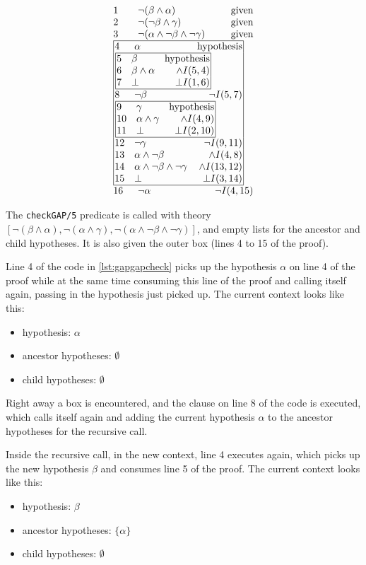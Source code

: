 \documentclass[11pt,twoside,a4paper]{report}
\begin{document}
\[\vbox{\offinterlineskip\halign{
&\tabskip=1.5em#\strut&$#$\hfil\tabskip=1em&\hfil$#$\tabskip=0em\cr
%
1&\neg(\beta\wedge\alpha)&\mbox{given}\cr
2&\neg(\neg\beta\wedge\gamma)&\mbox{given}\cr
3&\neg(\alpha\wedge\neg\beta\wedge\neg\gamma)&\mbox{given}\cr
%
\multispan3\vbox{\halign{
\vrule#&&\hskip.1em\tabskip=1em#\strut&$#$\hfil\tabskip=1em&\hfil$#$\hskip0.1em\tabskip=0em&\vrule#\cr
\noalign{\hrule}
%
&4&\alpha&\mbox{hypothesis}&\cr
%
&\multispan3\,\vbox{\halign{
\vrule#&&\hskip.1em\tabskip=1em#\strut&$#$\hfil\tabskip=1em&\hfil$#$\hskip0.1em\tabskip=0em&\vrule#\cr
\noalign{\hrule}
%
&5&\beta&\mbox{hypothesis}&\cr
&6&\beta\wedge\alpha&\wedge I(5,4)&\cr
&7&\bot&\bot I(1,6)&\cr
%
\noalign{\hrule}}}\,&\cr
%
&8&\neg\beta&\neg I(5,7)&\cr
%
&\multispan3\,\vbox{\halign{
\vrule#&&\hskip.1em\tabskip=1em#\strut&$#$\hfil\tabskip=1em&\hfil$#$\hskip0.1em\tabskip=0em&\vrule#\cr
\noalign{\hrule}
%
&9&\gamma&\mbox{hypothesis}&\cr
&10&\alpha\wedge\gamma&\wedge I(4,9)&\cr
&11&\bot&\bot I(2,10)&\cr
%
\noalign{\hrule}}}\,&\cr
%
&12&\neg\gamma&\neg I(9,11)&\cr
&13&\alpha\wedge\neg\beta&\wedge I(4,8)&\cr
&14&\alpha\wedge\neg\beta\wedge\neg\gamma&\wedge I(13,12)&\cr
&15&\bot&\bot I(3,14)&\cr
%
\noalign{\hrule}}}\,\cr
%
16&\neg\alpha&\neg I(4,15)\cr
}}\]

The \lstinline$checkGAP/5$ predicate is called with theory $[\neg(\beta\wedge\alpha), \neg(\alpha\wedge\gamma), \neg(\alpha\wedge\neg\beta\wedge\neg\gamma)]$, and empty lists for the ancestor and child hypotheses. It is also given the outer box (lines 4 to 15 of the proof). 

Line 4 of the code in \autoref{lst:gapgapcheck} picks up the hypothesis $\alpha$ on line 4 of the proof while at the same time consuming this line of the proof and calling itself again, passing in the hypothesis just picked up. The current context looks like this:
\begin{itemize}
\item
hypothesis: $\alpha$
\item
ancestor hypotheses: $\emptyset$
\item
child hypotheses: $\emptyset$
\end{itemize}

Right away a box is encountered, and the clause on line 8 of the code is executed, which calls itself again and adding the current hypothesis $\alpha$ to the ancestor hypotheses for the recursive call.

Inside the recursive call, in the new context, line 4 executes again, which picks up the new hypothesis $\beta$ and consumes line 5 of the proof. The current context looks like this:
\begin{itemize}
\item
hypothesis: $\beta$
\item
ancestor hypotheses: $\{\alpha\}$
\item
child hypotheses: $\emptyset$
\end{itemize}
\end{document}
